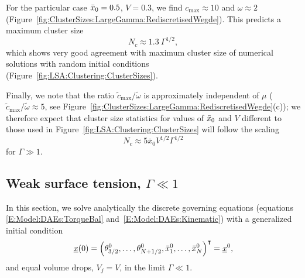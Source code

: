 For the particular case $\bar{x}_0 = 0.5$, $V = 0.3$, we find ${c}_{\max}\approx  10$ and $\omega \approx 2$ (Figure~\ref{fig:ClusterSizes:LargeGamma:RediscretisedWegde}). This predicts a maximum cluster size
\begin{equation}\label{E:ClusterSizes:LargeGamma:Scaling}
N_c \approx 1.3~\Gamma^{1/2},
\end{equation}
which shows very good agreement with maximum cluster size of numerical solutions with random initial conditions (Figure~\ref{fig:LSA:Clustering:ClusterSizes}).

Finally, we note that the ratio $\tilde{c}_{\max}/\tilde{\omega}$ is approximately independent of $\mu$ ($\tilde{c}_{\max}/\tilde{\omega} \approx 5$, see Figure~\ref{fig:ClusterSizes:LargeGamma:RediscretisedWegde}(c)); we therefore expect that cluster size statistics for values of $\bar{x}_0$ and $V$ different to those used in Figure~\ref{fig:LSA:Clustering:ClusterSizes} will follow the scaling
\begin{equation}
N_c \approx 5\bar{x}_0 V^{1/2} \Gamma^{1/2}
\end{equation}
for $\Gamma \gg 1$.


\subsection{Weak surface tension, $\Gamma \ll 1$}\label{S:ClusterAnalysis:SmallGamma}

In this section, we solve analytically the discrete governing equations (equations \eqref{E:Model:DAEs:TorqueBal} and~\eqref{E:Model:DAEs:Kinematic}) with a generalized initial condition
\begin{equation}\label{E:ClusterSizes:SmallGamma:IC}
\underline{x}(0) = \left(\theta_{3/2}^0, \dots, \theta_{N+1/2}^0,\bar{x}_1^0,\dots, \bar{x}_N^0\right)^\intercal = \underline{x}^0,
\end{equation}
and equal volume drops, $V_j = V$, in the limit $\Gamma \ll 1$.

